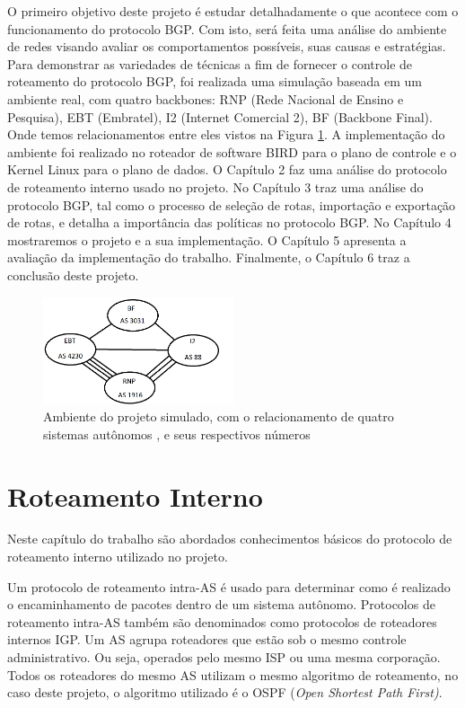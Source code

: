\documentclass[12pt,a4paper]{report}
\begin{document}
O primeiro objetivo deste projeto \'e estudar detalhadamente o que acontece com o funcionamento do protocolo BGP. Com isto, ser\'a feita uma an\'alise do ambiente de redes visando avaliar os comportamentos poss\'iveis, suas causas e estrat\'egias. Para demonstrar as variedades de t\'ecnicas a fim de fornecer o controle de roteamento do protocolo BGP, foi realizada uma simula\c{c}\~ao baseada em um ambiente real, com quatro backbones: RNP (Rede Nacional de Ensino e Pesquisa), EBT (Embratel), I2 (Internet Comercial 2), BF (Backbone Final). Onde temos relacionamentos entre eles vistos na Figura \ref{fig:Ambiente do projeto}. A implementa\c{c}\~ao do ambiente foi realizado no roteador de software BIRD para o plano de controle e o Kernel Linux para o plano de dados. O Cap\'itulo 2 faz uma an\'alise do protocolo de roteamento interno usado no projeto. No Cap\'itulo 3 traz uma an\'alise do protocolo BGP, tal como o processo de sele\c{c}\~ao de rotas, importa\c{c}\~ao e exporta\c{c}\~ao de rotas, e detalha a import\^ancia das pol\'iticas no protocolo BGP. No Cap\'itulo 4 mostraremos o projeto e a sua implementa\c{c}\~ao. O Cap\'itulo 5 apresenta a avalia\c{c}\~ao da implementa\c{c}\~ao do trabalho. Finalmente, o Cap\'itulo 6 traz a conclus\~ao deste projeto.

\begin{figure}[!htb]
 \centering
 \includegraphics[width=0.5\textwidth]{Imagens/Ambiente}
  \caption{\label{fig:Ambiente do projeto} Ambiente do projeto simulado, com o relacionamento de quatro sistemas aut\^onomos , e seus respectivos n\'umeros}
\end{figure}


\chapter{Roteamento Interno}

Neste cap\'itulo do trabalho s\~ao abordados conhecimentos b\'asicos do protocolo de roteamento interno utilizado no projeto.

Um protocolo de roteamento intra-AS \'e usado para determinar como \'e realizado o encaminhamento de pacotes dentro de um sistema aut\^onomo. Protocolos de roteamento intra-AS tamb\'em s\~ao denominados como protocolos de roteadores internos IGP. Um AS agrupa roteadores que est\~ao sob o mesmo controle administrativo. Ou seja, operados pelo mesmo ISP ou uma mesma corpora\c{c}\~ao. Todos os roteadores do mesmo AS utilizam o mesmo algoritmo de roteamento, no caso deste projeto, o algoritmo utilizado \'e o OSPF (\textit{Open Shortest Path First)}. 
\end{document}
